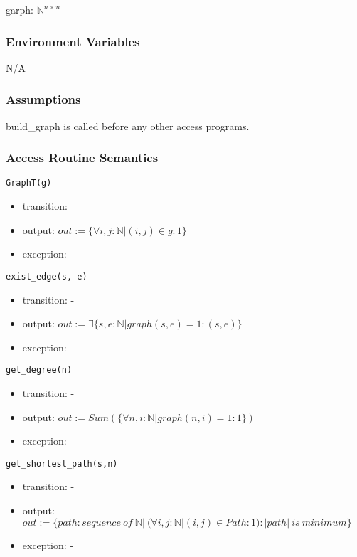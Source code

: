 \documentclass[12pt, titlepage]{article}
\begin{document}
garph: ${\mathbb{N}}^ {n\times n}$ 


\subsubsection{Environment Variables}

N/A

\subsubsection{Assumptions}


{build\_graph} is called before any other access programs.



\subsubsection{Access Routine Semantics}

\noindent \texttt{GraphT(g)}
\begin{itemize}
\item transition: 
\item output: $out:=\{\forall i, j:\mathbb{N}| \left(i, j\right)\in g: 1 \}$
\item exception: -
\end{itemize}

\noindent \texttt{exist\_edge(s, e)}
\begin{itemize}
\item transition: -
\item output: $out:= \exists \{s,e: \mathbb{N}| graph\left(s,e\right) =1: \left(s,e\right) \}$
\item exception:-  
\end{itemize}

\noindent \texttt{get\_degree(n)}
\begin{itemize}
\item transition: -
\item output: $out:= Sum(\{\forall n, i:\mathbb{N}| graph\left(n, i\right) =1: 1 \})$
\item exception: -
\end{itemize}

\noindent \texttt{get\_shortest\_path(s,n)}
\begin{itemize}
\item transition: -
\item output: $out:= \{path: sequence\ of\ \mathbb{N}|\ (\forall i, j:\mathbb{N}| \left(i, j\right)\in Path: 1): |path|\ is\ minimum\} $
\item exception: -   
\end{itemize}
\end{document}
